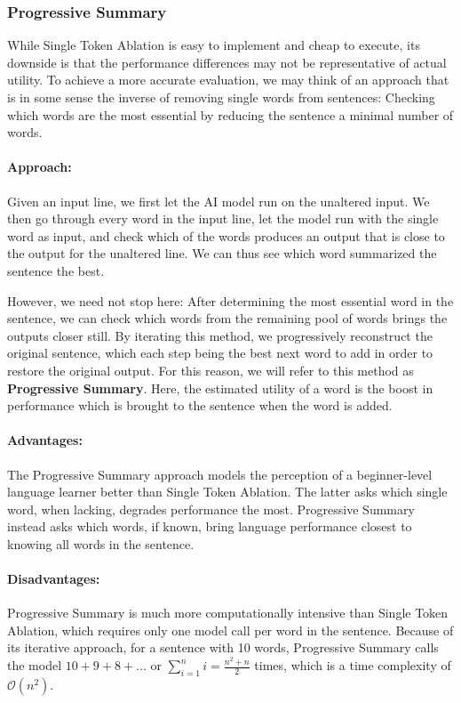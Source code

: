\subsubsection{Progressive Summary}
While Single Token Ablation is easy to implement and cheap to execute, its downside is that the performance differences may not be representative of actual utility.
To achieve a more accurate evaluation, we may think of an approach that is in some sense the inverse of removing single words from sentences:
Checking which words are the most essential by reducing the sentence a minimal number of words.

\paragraph{Approach:}
Given an input line, we first let the AI model run on the unaltered input.
We then go through every word in the input line, let the model run with the single word as input, and check which of the words produces an output that is close to the output for the unaltered line.
We can thus see which word summarized the sentence the best.

However, we need not stop here:
After determining the most essential word in the sentence, we can check which words from the remaining pool of words brings the outputs closer still.
By iterating this method, we progressively reconstruct the original sentence, which each step being the best next word to add in order to restore the original output.
For this reason, we will refer to this method as \textbf{Progressive Summary}.
Here, the estimated utility of a word is the boost in performance which is brought to the sentence when the word is added.

\paragraph{Advantages:}
The Progressive Summary approach models the perception of a beginner-level language learner better than Single Token Ablation.
The latter asks which single word, when lacking, degrades performance the most.
Progressive Summary instead asks which words, if known, bring language performance closest to knowing all words in the sentence.

\paragraph{Disadvantages:}
Progressive Summary is much more computationally intensive than Single Token Ablation, which requires only one model call per word in the sentence.
Because of its iterative approach, for a sentence with 10 words, Progressive Summary calls the model $10+9+8+... $ or $\sum_{i=1}^{n}i = \frac{n^2 + n}{2}$ times, which is a time complexity of $\mathcal{O}(n^2)$.


